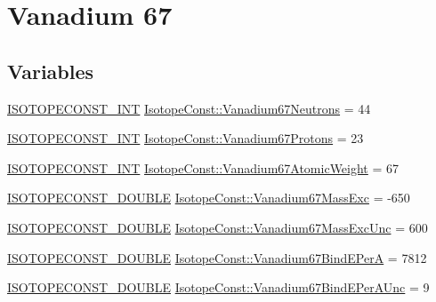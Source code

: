\hypertarget{group___isotope_const-_vanadium-_v67}{}\section{Vanadium 67}
\label{group___isotope_const-_vanadium-_v67}
\subsection*{Variables}
\begin{DoxyCompactItemize}
\item 
\mbox{\hyperlink{group___isotope_const-_macros_ga5f18360b3e99483a35c32d789e62621c}{I\+S\+O\+T\+O\+P\+E\+C\+O\+N\+S\+T\+\_\+\+I\+NT}} \mbox{\hyperlink{group___isotope_const-_vanadium-_v67_ga06c6de09e9829181710809832b25082e}{Isotope\+Const\+::\+Vanadium67\+Neutrons}} = 44
\item 
\mbox{\hyperlink{group___isotope_const-_macros_ga5f18360b3e99483a35c32d789e62621c}{I\+S\+O\+T\+O\+P\+E\+C\+O\+N\+S\+T\+\_\+\+I\+NT}} \mbox{\hyperlink{group___isotope_const-_vanadium-_v67_gafb8f7d70e5e0b6d4803acf0a909d7c81}{Isotope\+Const\+::\+Vanadium67\+Protons}} = 23
\item 
\mbox{\hyperlink{group___isotope_const-_macros_ga5f18360b3e99483a35c32d789e62621c}{I\+S\+O\+T\+O\+P\+E\+C\+O\+N\+S\+T\+\_\+\+I\+NT}} \mbox{\hyperlink{group___isotope_const-_vanadium-_v67_gaaf98168c75468c8e28f63e6aa88c22ab}{Isotope\+Const\+::\+Vanadium67\+Atomic\+Weight}} = 67
\item 
\mbox{\hyperlink{group___isotope_const-_macros_ga8f45a7272ce02c0b4c65c44636ed719a}{I\+S\+O\+T\+O\+P\+E\+C\+O\+N\+S\+T\+\_\+\+D\+O\+U\+B\+LE}} \mbox{\hyperlink{group___isotope_const-_vanadium-_v67_gafdb263d8a8198e5dd6111aae330b726a}{Isotope\+Const\+::\+Vanadium67\+Mass\+Exc}} = -\/650
\item 
\mbox{\hyperlink{group___isotope_const-_macros_ga8f45a7272ce02c0b4c65c44636ed719a}{I\+S\+O\+T\+O\+P\+E\+C\+O\+N\+S\+T\+\_\+\+D\+O\+U\+B\+LE}} \mbox{\hyperlink{group___isotope_const-_vanadium-_v67_gac7bc5bf6b1691a3d80ffe174bff8d5d6}{Isotope\+Const\+::\+Vanadium67\+Mass\+Exc\+Unc}} = 600
\item 
\mbox{\hyperlink{group___isotope_const-_macros_ga8f45a7272ce02c0b4c65c44636ed719a}{I\+S\+O\+T\+O\+P\+E\+C\+O\+N\+S\+T\+\_\+\+D\+O\+U\+B\+LE}} \mbox{\hyperlink{group___isotope_const-_vanadium-_v67_ga002270d0141ffc1cd715be6e1796d9d1}{Isotope\+Const\+::\+Vanadium67\+Bind\+E\+PerA}} = 7812
\item 
\mbox{\hyperlink{group___isotope_const-_macros_ga8f45a7272ce02c0b4c65c44636ed719a}{I\+S\+O\+T\+O\+P\+E\+C\+O\+N\+S\+T\+\_\+\+D\+O\+U\+B\+LE}} \mbox{\hyperlink{group___isotope_const-_vanadium-_v67_gac2ea3db2c9286907ee43e1280c121576}{Isotope\+Const\+::\+Vanadium67\+Bind\+E\+Per\+A\+Unc}} = 9

\end{DoxyCompactItemize}

